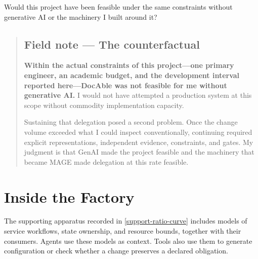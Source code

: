 
Would this project have been feasible under the same constraints without generative AI or the machinery I built around it?


\begin{quote}
\mbox{}%
\subsection{Field note --- The counterfactual}\label{heading:fieldnote-counterfactual}

\textbf{Within the actual constraints of this project---one primary engineer, an academic budget, and the development interval reported here---DocAble was not feasible for me without generative AI.} I would not have attempted a production system at this scope without commodity implementation capacity.

Sustaining that delegation posed a second problem. Once the change volume exceeded what I could inspect conventionally, continuing required explicit representations, independent evidence, constraints, and gates. My judgment is that GenAI made the project feasible and the machinery that became MAGE made delegation at this rate feasible.
\end{quote}

\section{Inside the Factory}\label{heading:inside-the-factory}



The supporting apparatus recorded in \autoref{support-ratio-curve} includes models of service workflows, state ownership, and resource bounds, together with their consumers. Agents use these models as context. Tools also use them to generate configuration or check whether a change preserves a declared obligation.

